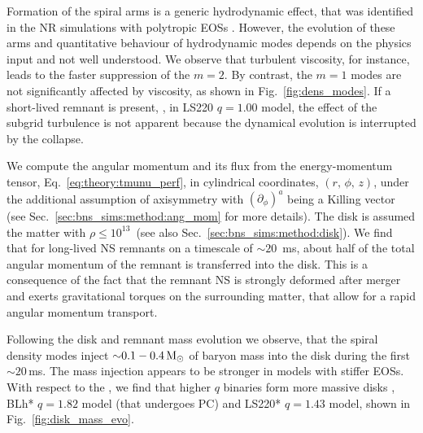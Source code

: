 Formation of the spiral arms is a generic hydrodynamic effect, that was identified 
in the \ac{NR} simulations with polytropic \acp{EOS} \citep{Bernuzzi:2013rza,Radice:2016gym}.
However, the evolution of these arms and quantitative behaviour of hydrodynamic
modes depends on the physics input and not well understood. We observe that  turbulent viscosity, for instance, 
leads to the faster suppression of the $m=2$. By contrast, the $m=1$ modes are not
significantly affected by viscosity, as shown in Fig.~\ref{fig:dens_modes}.
%
If a short-lived remnant is present, \ie, in 
LS220 $q=1.00$ model, 
the effect of the subgrid turbulence is not apparent because 
the dynamical evolution is interrupted by the collapse.

%
We compute the angular momentum and its flux from the energy-momentum 
tensor, Eq.~\eqref{eq:theory:tmunu_perf},
in cylindrical coordinates, $(r,\, \phi,\, z)$, under the additional
assumption of axisymmetry with $(\partial_{\phi})^a$ being a Killing vector
(see Sec.~\ref{sec:bns_sims:method:ang_mom} for more details).
%
The disk is assumed the matter with $\rho\leq10^{13}\,$\gcm{} 
(see also Sec.~\ref{sec:bns_sims:method:disk}).
%
We find that for long-lived \ac{NS} remnants on a timescale of ${\sim}20$~ms, 
about half of the total angular momentum of the remnant is transferred 
into the disk. 
This is a consequence of the fact that the remnant \ac{NS} is strongly deformed 
after merger and exerts gravitational torques on the surrounding matter, 
that allow for a rapid angular momentum transport.

Following the disk and remnant mass evolution we observe, that the spiral 
density modes inject ${\sim}0.1-0.4\,{\text{M}_{\odot}}$ of baryon mass into the disk during the 
first ${\sim}20\,$ms. 
The mass injection appears to be stronger in models with stiffer \acp{EOS}. 
With respect to the \mr{}, we find that higher $q$ binaries form more massive disks 
\eg, BLh* $q=1.82$ model (that undergoes \ac{PC}) and 
LS220* $q=1.43$ model, 
shown in Fig.~\ref{fig:disk_mass_evo}.

